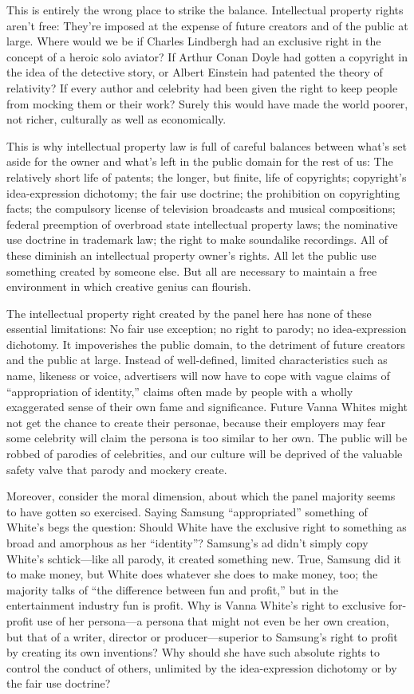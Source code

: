 This is entirely the wrong place to strike the balance. Intellectual property
rights aren't free: They're imposed at the expense of future creators and of
the public at large. Where would we be if Charles Lindbergh had an exclusive
right in the concept of a heroic solo aviator? If Arthur Conan Doyle had gotten
a copyright in the idea of the detective story, or Albert Einstein had patented
the theory of relativity? If every author and celebrity had been given the
right to keep people from mocking them or their work? Surely this would have
made the world poorer, not richer, culturally as well as economically.

This is why intellectual property law is full of careful balances between what's
set aside for the owner and what's left in the public domain for the rest of
us: The relatively short life of patents; the longer, but finite, life of
copyrights; copyright's idea-expression dichotomy; the fair use doctrine; the
prohibition on copyrighting facts; the compulsory license of television
broadcasts and musical compositions; federal preemption of overbroad state
intellectual property laws; the nominative use doctrine in trademark law; the
right to make soundalike recordings. All of these diminish an intellectual
property owner's rights. All let the public use something created by someone
else. But all are necessary to maintain a free environment in which creative
genius can flourish.

The intellectual property right created by the panel here has none of these
essential limitations: No fair use exception; no right to parody; no
idea-expression dichotomy. It impoverishes the public domain, to the detriment
of future creators and the public at large. Instead of well-defined, limited
characteristics such as name, likeness or voice, advertisers will now have to
cope with vague claims of ``appropriation of identity,'' claims often made by
people with a wholly exaggerated sense of their own fame and significance.
Future Vanna Whites might not get the chance to create their personae, because
their employers may fear some celebrity will claim the persona is too similar
to her own. The public will be robbed of parodies of celebrities, and our
culture will be deprived of the valuable safety valve that parody and mockery
create.

Moreover, consider the moral dimension, about which the panel majority seems to
have gotten so exercised. Saying Samsung ``appropriated'' something of White's
begs the question: Should White have the exclusive right to something as broad
and amorphous as her ``identity''? Samsung's ad didn't simply copy White's
schtick---like all parody, it created something new. True, Samsung did it to
make money, but White does whatever she does to make money, too; the majority
talks of ``the difference between fun and profit,'' but in the entertainment
industry fun is profit. Why is Vanna White's right to exclusive for-profit use
of her persona---a persona that might not even be her own creation, but that
of a writer, director or producer---superior to Samsung's right to profit by
creating its own inventions? Why should she have such absolute rights to
control the conduct of others, unlimited by the idea-expression dichotomy or by
the fair use doctrine?

